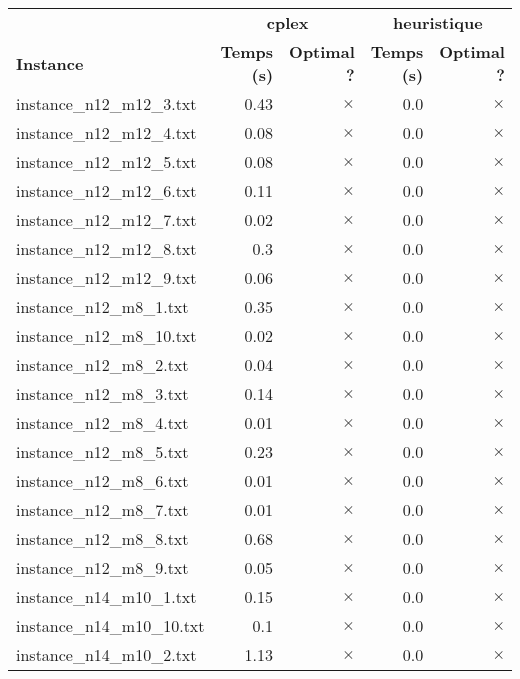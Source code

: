 \documentclass{article}
\begin{document}
\newpage
\begin{center}
\renewcommand{\arraystretch}{1.4} 
 \begin{tabular}{lrrrr}
	\hline
 & \multicolumn{2}{c}{\textbf{cplex}} & \multicolumn{2}{c}{\textbf{heuristique}}\\
\textbf{Instance}  & \textbf{Temps (s)} & \textbf{Optimal ?}  & \textbf{Temps (s)} & \textbf{Optimal ?} \\\hline

instance\_n12\_m12\_3.txt & 0.43 & 
$\times$
 & 0.0 & 
$\times$
\\
instance\_n12\_m12\_4.txt & 0.08 & 
$\times$
 & 0.0 & 
$\times$
\\
instance\_n12\_m12\_5.txt & 0.08 & 
$\times$
 & 0.0 & 
$\times$
\\
instance\_n12\_m12\_6.txt & 0.11 & 
$\times$
 & 0.0 & 
$\times$
\\
instance\_n12\_m12\_7.txt & 0.02 & 
$\times$
 & 0.0 & 
$\times$
\\
instance\_n12\_m12\_8.txt & 0.3 & 
$\times$
 & 0.0 & 
$\times$
\\
instance\_n12\_m12\_9.txt & 0.06 & 
$\times$
 & 0.0 & 
$\times$
\\
instance\_n12\_m8\_1.txt & 0.35 & 
$\times$
 & 0.0 & 
$\times$
\\
instance\_n12\_m8\_10.txt & 0.02 & 
$\times$
 & 0.0 & 
$\times$
\\
instance\_n12\_m8\_2.txt & 0.04 & 
$\times$
 & 0.0 & 
$\times$
\\
instance\_n12\_m8\_3.txt & 0.14 & 
$\times$
 & 0.0 & 
$\times$
\\
instance\_n12\_m8\_4.txt & 0.01 & 
$\times$
 & 0.0 & 
$\times$
\\
instance\_n12\_m8\_5.txt & 0.23 & 
$\times$
 & 0.0 & 
$\times$
\\
instance\_n12\_m8\_6.txt & 0.01 & 
$\times$
 & 0.0 & 
$\times$
\\
instance\_n12\_m8\_7.txt & 0.01 & 
$\times$
 & 0.0 & 
$\times$
\\
instance\_n12\_m8\_8.txt & 0.68 & 
$\times$
 & 0.0 & 
$\times$
\\
instance\_n12\_m8\_9.txt & 0.05 & 
$\times$
 & 0.0 & 
$\times$
\\
instance\_n14\_m10\_1.txt & 0.15 & 
$\times$
 & 0.0 & 
$\times$
\\
instance\_n14\_m10\_10.txt & 0.1 & 
$\times$
 & 0.0 & 
$\times$
\\
instance\_n14\_m10\_2.txt & 1.13 & 
$\times$
 & 0.0 & 
$\times$
\\

\end{tabular}
\end{center}
\end{document}
